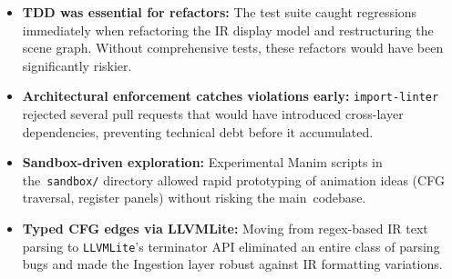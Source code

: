 \begin{itemize}
    \item \textbf{TDD was essential for refactors:} The test suite caught regressions immediately when refactoring the IR display model and restructuring the scene graph. Without comprehensive tests, these refactors would have been significantly riskier.

    \item \textbf{Architectural enforcement catches violations early:} \texttt{import-linter} rejected several pull requests that would have introduced cross-layer dependencies, preventing technical debt before it accumulated.

    \item \textbf{Sandbox-driven exploration:} Experimental Manim scripts in the~\texttt{sandbox/} directory allowed rapid prototyping of animation ideas (CFG traversal, register panels) without risking the main~codebase.

    \item \textbf{Typed CFG edges via LLVMLite:} Moving from regex-based IR text parsing to \texttt{LLVMLite}'s terminator API eliminated an entire class of parsing bugs and made the Ingestion layer robust against IR formatting variations.
\end{itemize}

